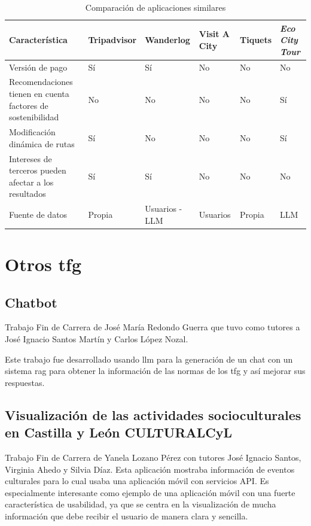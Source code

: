 \begin{table}[h]
	\centering
	\renewcommand{\arraystretch}{1.5} %
	\begin{tabular}{m{4.5cm} >{\centering\arraybackslash}m{2cm} >{\centering\arraybackslash}m{2cm} >{\centering\arraybackslash}m{2cm} >{\centering\arraybackslash}m{2cm} >{\centering\arraybackslash}m{2.5cm}} %
	\toprule
	\textbf{Característica} & \textbf{Tripadvisor} & \textbf{Wanderlog} & \textbf{Visit A City} & \textbf{Tiquets} & \textbf{\textit{Eco City Tour}} \\
	\midrule
	Versión de pago & Sí & Sí & No & No & No\\
	Recomendaciones tienen en cuenta factores de sostenibilidad & No & No & No & No & Sí\\
	Modificación dinámica de rutas & Sí & No & No & No & Sí\\
	Intereses de terceros pueden afectar a los resultados & Sí & Sí & No & No & No \\
	Fuente de datos & Propia & Usuarios - LLM & Usuarios & Propia & LLM\\
	\bottomrule
	\end{tabular}
	\caption{Comparación de aplicaciones similares} %
	\label{herramientasportipodeuso}
	\end{table}
	
\section{Otros \acrfull{tfg}}
	\subsection{Chatbot}
	Trabajo Fin de Carrera de José María Redondo Guerra \cite{chatbot_github} que tuvo como tutores a José Ignacio Santos Martín y Carlos López Nozal.
	
	Este trabajo fue desarrollado usando \acrfull{llm} para la generación de un chat con un sistema \acrshort{rag} para obtener la información de las normas de los \acrshort{tfg} y así mejorar sus respuestas.
	
	\subsection{Visualización de las actividades socioculturales en Castilla y León CULTURALCyL}
	Trabajo Fin de Carrera de Yanela Lozano Pérez con tutores José Ignacio Santos, Virginia Ahedo y Silvia Díaz.
	Esta aplicación mostraba información de eventos culturales para lo cual usaba una aplicación móvil con servicios API.
	Es especialmente interesante como ejemplo de una aplicación móvil con una fuerte característica de usabilidad, ya que se centra en la visualización de mucha información que debe recibir el usuario de manera clara y sencilla.